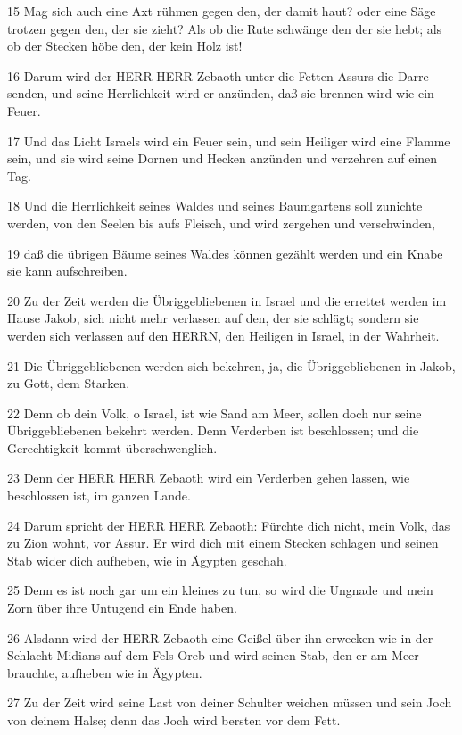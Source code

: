 \par 15 Mag sich auch eine Axt rühmen gegen den, der damit haut? oder eine Säge trotzen gegen den, der sie zieht? Als ob die Rute schwänge den der sie hebt; als ob der Stecken höbe den, der kein Holz ist!
\par 16 Darum wird der HERR HERR Zebaoth unter die Fetten Assurs die Darre senden, und seine Herrlichkeit wird er anzünden, daß sie brennen wird wie ein Feuer.
\par 17 Und das Licht Israels wird ein Feuer sein, und sein Heiliger wird eine Flamme sein, und sie wird seine Dornen und Hecken anzünden und verzehren auf einen Tag.
\par 18 Und die Herrlichkeit seines Waldes und seines Baumgartens soll zunichte werden, von den Seelen bis aufs Fleisch, und wird zergehen und verschwinden,
\par 19 daß die übrigen Bäume seines Waldes können gezählt werden und ein Knabe sie kann aufschreiben.
\par 20 Zu der Zeit werden die Übriggebliebenen in Israel und die errettet werden im Hause Jakob, sich nicht mehr verlassen auf den, der sie schlägt; sondern sie werden sich verlassen auf den HERRN, den Heiligen in Israel, in der Wahrheit.
\par 21 Die Übriggebliebenen werden sich bekehren, ja, die Übriggebliebenen in Jakob, zu Gott, dem Starken.
\par 22 Denn ob dein Volk, o Israel, ist wie Sand am Meer, sollen doch nur seine Übriggebliebenen bekehrt werden. Denn Verderben ist beschlossen; und die Gerechtigkeit kommt überschwenglich.
\par 23 Denn der HERR HERR Zebaoth wird ein Verderben gehen lassen, wie beschlossen ist, im ganzen Lande.
\par 24 Darum spricht der HERR HERR Zebaoth: Fürchte dich nicht, mein Volk, das zu Zion wohnt, vor Assur. Er wird dich mit einem Stecken schlagen und seinen Stab wider dich aufheben, wie in Ägypten geschah.
\par 25 Denn es ist noch gar um ein kleines zu tun, so wird die Ungnade und mein Zorn über ihre Untugend ein Ende haben.
\par 26 Alsdann wird der HERR Zebaoth eine Geißel über ihn erwecken wie in der Schlacht Midians auf dem Fels Oreb und wird seinen Stab, den er am Meer brauchte, aufheben wie in Ägypten.
\par 27 Zu der Zeit wird seine Last von deiner Schulter weichen müssen und sein Joch von deinem Halse; denn das Joch wird bersten vor dem Fett.
